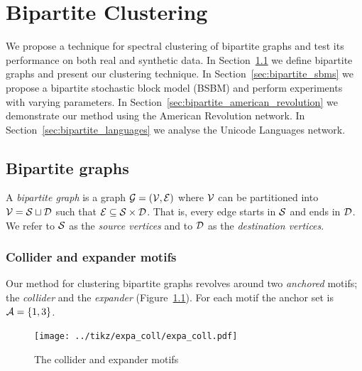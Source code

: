 \chapter{Bipartite Clustering} \label{chap:bipartite}

We propose a technique for spectral clustering of bipartite graphs and test its performance on both real and synthetic data.
In Section~\ref{sec:bipartite_graphs} we define bipartite graphs and present our clustering technique.
In Section~\ref{sec:bipartite_sbms} we propose a bipartite stochastic block model (BSBM) and perform experiments with varying parameters.
In Section~\ref{sec:bipartite_american_revolution} we demonstrate our method using the American Revolution network.
In Section~\ref{sec:bipartite_languages} we analyse the Unicode Languages network.






\section{Bipartite graphs} \label{sec:bipartite_graphs}





\begin{definition}
A \emph{bipartite graph} is a graph $\mathcal{G}=(\mathcal{V,E})$ where $\mathcal{V}$ can be partitioned into $\mathcal{V} = \mathcal{S} \sqcup \mathcal{D}$ such that $\mathcal{E} \subseteq \mathcal{S} \times \mathcal{D}$. That is, every edge starts in $\mathcal{S}$ and ends in $\mathcal{D}$. We refer to $\mathcal{S}$ as the \emph{source vertices} and to $\mathcal{D}$ as the \emph{destination vertices}.
\end{definition}


\subsection{Collider and expander motifs} \label{sec:coll_expa}


Our method for clustering bipartite graphs revolves around two \emph{anchored} motifs; the \emph{collider} and the \emph{expander} (Figure~\ref{fig:expa_coll}). For each motif the anchor set is $\mathcal{A}=\{ 1,3 \}$.

\begin{figure}[H]
	\centering
	\texttt{[image: ../tikz/expa\_coll/expa\_coll.pdf]}
	\caption{The collider and expander motifs}
	\label{fig:expa_coll}
\end{figure}


